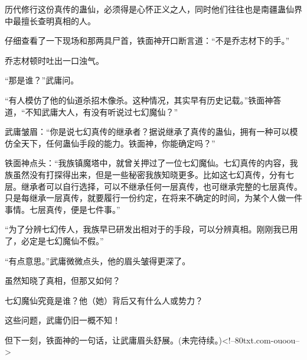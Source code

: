 \begin{this_body}
历代修行这份真传的蛊仙，必须得是心怀正义之人，同时他们往往也是南疆蛊仙界中最擅长查明真相的人。

仔细查看了一下现场和那两具尸首，铁面神开口断言道：“不是乔志材下的手。”

乔志材顿时吐出一口浊气。

“那是谁？”武庸问。

“有人模仿了他的仙道杀招木像杀。这种情况，其实早有历史记载。”铁面神答道，“不知武庸大人，有没有听说过七幻魔仙？”

武庸皱眉：“你是说七幻真传的继承者？据说继承了真传的蛊仙，拥有一种可以模仿全天下，任何蛊仙手段的能力。铁面神，你能确定吗？”

铁面神点头：“我族镇魔塔中，就曾关押过了一位七幻魔仙。七幻真传的内容，我族虽然没有打探得出来，但是一些秘密我族知晓更多。比如这七幻真传，分有七层。继承者可以自行选择，可以不继承任何一层真传，也可继承完整的七层真传。只是每继承一层真传，就要履行一份约定，在将来不确定的时间，为某个人做一件事情。七层真传，便是七件事。”

“为了分辨七幻传人，我族早已研发出相对于的手段，可以分辨真相。刚刚我已用了，必定是七幻魔仙不假。”

“有点意思。”武庸微微点头，他的眉头皱得更深了。

虽然知晓了真相，但那又如何？

七幻魔仙究竟是谁？他（她）背后又有什么人或势力？

这些问题，武庸仍旧一概不知！

但下一刻，铁面神的一句话，让武庸眉头舒展。(未完待续。)<!--80txt.com-ouoou-->

\end{this_body}

